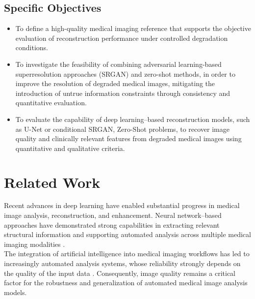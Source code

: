 \documentclass[12pt,letterpaper]{article}     %
\begin{document}
\subsection{Specific Objectives}
\begin{itemize}
    \item To define a high-quality medical imaging reference that supports the objective evaluation of reconstruction performance under controlled degradation conditions.
    
    \item To investigate the feasibility of combining adversarial learning-based superresolution approaches (SRGAN) and zero-shot methods, in order to improve the resolution of degraded medical images, mitigating the introduction of untrue information constraints through consistency and quantitative evaluation.
    
    \item To evaluate the capability of deep learning–based reconstruction models, such as U-Net or conditional SRGAN, Zero-Shot problems, to recover image quality and clinically relevant features from degraded medical images using quantitative and qualitative criteria.
\end{itemize}





\section{Related Work}

\noindent Recent advances in deep learning have enabled substantial progress in medical image analysis, reconstruction, and enhancement. Neural network–based approaches have demonstrated strong capabilities in extracting relevant structural information and supporting automated analysis across multiple medical imaging modalities \cite{ML, zhang}.\\

\noindent The integration of artificial intelligence into medical imaging workflows has led to increasingly automated analysis systems, whose reliability strongly depends on the quality of the input data \cite{noninvasive, radiology}. Consequently, image quality remains a critical factor for the robustness and generalization of automated medical image analysis models.\\
\end{document}

